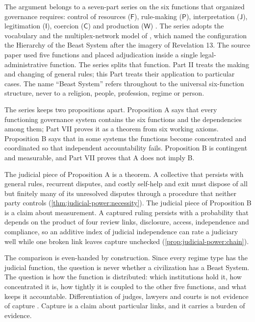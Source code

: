 \documentclass[11pt,letterpaper]{article}
\theoremstyle{definition}
\theoremstyle{remark}
\newcommand{\pF}{\mathsf{F}}
\newcommand{\pP}{\mathsf{P}}
\newcommand{\pJ}{\mathsf{J}}
\newcommand{\pI}{\mathsf{I}}
\newcommand{\pC}{\mathsf{C}}
\newcommand{\pW}{\mathsf{W}}
\begin{document}
The argument belongs to a seven-part series on the six functions that organized governance requires: control of resources ($\pF$), rule-making ($\pP$), interpretation ($\pJ$), legitimation ($\pI$), coercion ($\pC$) and production ($\pW$) \citep{long2026financial,long2026political,long2026ideological,long2026coercive,long2026productive,long2026formalized}. The series adopts the vocabulary and the multiplex-network model of \citet{largo2026hbs}, which named the configuration the Hierarchy of the Beast System after the imagery of Revelation 13. The source paper used five functions and placed adjudication inside a single legal-administrative function. The series splits that function. Part II treats the making and changing of general rules; this Part treats their application to particular cases. The name ``Beast System'' refers throughout to the universal six-function structure, never to a religion, people, profession, regime or person.

The series keeps two propositions apart. Proposition A says that every functioning governance system contains the six functions and the dependencies among them; Part VII proves it as a theorem from six working axioms. Proposition B says that in some systems the functions become concentrated and coordinated so that independent accountability fails. Proposition B is contingent and measurable, and Part VII proves that A does not imply B.

The judicial piece of Proposition A is a theorem. A collective that persists with general rules, recurrent disputes, and costly self-help and exit must dispose of all but finitely many of its unresolved disputes through a procedure that neither party controls (\cref{thm:judicial-power:necessity}). The judicial piece of Proposition B is a claim about measurement. A captured ruling persists with a probability that depends on the product of four review links, disclosure, access, independence and compliance, so an additive index of judicial independence can rate a judiciary well while one broken link leaves capture unchecked (\cref{prop:judicial-power:chain}).

The comparison is even-handed by construction. Since every regime type has the judicial function, the question is never whether a civilization has a Beast System. The question is how the function is distributed: which institutions hold it, how concentrated it is, how tightly it is coupled to the other five functions, and what keeps it accountable. Differentiation of judges, lawyers and courts is not evidence of capture \citep{largo2026hbs}. Capture is a claim about particular links, and it carries a burden of evidence.
\end{document}
